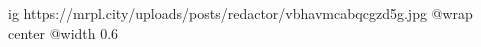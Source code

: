  
 
 
 
 

\ifcmt
  ig https://mrpl.city/uploads/posts/redactor/vbhavmcabqcgzd5g.jpg
  @wrap center
  @width 0.6
\fi
